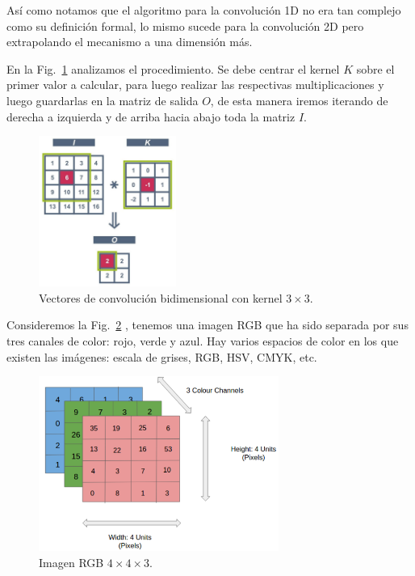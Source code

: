 \documentclass[a4paper,12pt]{article}
\begin{document}
Así como notamos que el algoritmo para la convolución 1D no era tan complejo como su definición formal, lo mismo sucede para la convolución 2D pero extrapolando el mecanismo a una dimensión más.

En la Fig.~\ref{fig:conv2d} \citep{andrianaivo2019architecture} analizamos el procedimiento. Se debe centrar el kernel $K$ sobre el primer valor a calcular, para luego realizar las respectivas multiplicaciones y luego guardarlas en la matriz de salida $O$, de esta manera iremos iterando de derecha a izquierda y de arriba hacia abajo toda la matriz $I$.

\begin{figure}[H]
	\begin{center}				
	\includegraphics[width=0.4\textwidth]{convolution2d.jpg}
  	\caption{Vectores de convolución bidimensional con kernel $3 \times 3$.}
  	\label{fig:conv2d}
  	\end{center}
\end{figure}

Consideremos la Fig.~\ref{fig:conv2dimg} \citep{Saha2020Oct}, tenemos una imagen RGB que ha sido separada por sus tres canales de color: rojo, verde y azul. Hay varios espacios de color en los que existen las imágenes: escala de grises, RGB, HSV, CMYK, etc.

\begin{figure}[H]
	\begin{center}				
	\includegraphics[width=0.7\textwidth]{imgrgb.png}
  	\caption{Imagen RGB $4 \times 4 \times 3$.}
  	\label{fig:conv2dimg}
  	\end{center}
\end{figure}
\end{document}
